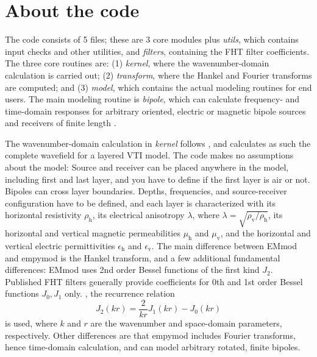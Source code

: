 \documentclass[paper]{geophysics}
\begin{document}
\section{About the code}

The code consists of 5 files; these are 3 core modules plus \emph{utils}, which
contains input checks and other utilities, and \emph{filters}, containing the
FHT filter coefficients. The three core routines are: (1) \emph{kernel}, where
the wavenumber-domain calculation is carried out; (2) \emph{transform}, where
the Hankel and Fourier transforms are computed; and (3) \emph{model}, which
contains the actual modeling routines for end users. The main modeling routine
is \emph{bipole}, which can calculate frequency- and time-domain responses for
arbitrary oriented, electric or magnetic bipole sources and receivers of finite
length .

The wavenumber-domain calculation in \emph{kernel} follows
\cite{GEO.15.Hunziker}, and calculates as such the complete wavefield for a
layered VTI model. The code makes no assumptions about the model: Source and
receiver can be placed anywhere in the model, including first and last layer,
and you have to define if the first layer is air or not. Bipoles can cross
layer boundaries. Depths, frequencies, and source-receiver configuration have
to be defined, and each layer is characterized with its horizontal resistivity
$\rho_\textrm{h}$, its electrical anisotropy $\lambda$, where $\lambda =
\sqrt{\rho_\textrm{v}/\rho_\textrm{h}}$, its horizontal and vertical magnetic
permeabilities $\mu_\mathrm{h}$ and $\mu_\mathrm{v}$, and the horizontal and
vertical electric permittivities $\epsilon_\mathrm{h}$ and
$\epsilon_\mathrm{v}$. The main difference between EMmod and empymod is the
Hankel transform, and a few additional fundamental differences: EMmod uses 2nd
order Bessel functions of the first kind $J_2$. Published FHT filters
generally provide coefficients for 0th and 1st order Bessel functions $J_0,
J_1$ only. , the recurrence relation
%
\begin{equation}
  J_2(kr) = \frac{2}{kr}J_1(kr) - J_0(kr)
  \label{eq:j2}
\end{equation}
%
is used, where $k$ and $r$ are the wavenumber and space-domain parameters,
respectively. Other differences are that empymod includes Fourier transforms,
hence time-domain calculation, and can model arbitrary rotated, finite bipoles.
\end{document}
